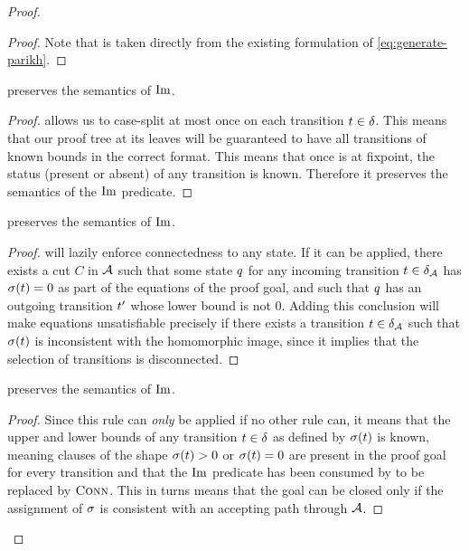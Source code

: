 \documentclass[acmsmall,review,anonymous,screen]{acmart}\settopmatter{printfolios=true,printccs=false,printacmref=true}
\theoremstyle{definition}
\begin{document}
\begin{proof}
\begin{proof}
  Note that \Expand{} is taken directly from the existing formulation of
  \eqref{eq:generate-parikh}.
\end{proof}

\begin{lemma}\label{lma:split-preserves}
  \Split{} preserves the semantics of $\operatorname{Im}$.
\end{lemma}
\begin{proof}
  \Split{} allows us to case-split at most once on each transition $t
  \in \delta$. This means that our proof tree at its leaves will be
  guaranteed to have all transitions of known bounds in the correct format. This
  means that once \Split{} is at fixpoint, the status (present or absent) of any
  transition is known. Therefore it preserves the semantics of the $\operatorname{Im}$
  predicate.
\end{proof}

\begin{lemma}\label{lma:propagate-preserves}
  \Propagate{} preserves the semantics of $\operatorname{Im}$.
\end{lemma}
\begin{proof}
  \Propagate{} will lazily enforce connectedness to any state. If it can be
  applied, there exists a cut $C$ in $\mathcal{A}$ such that some state $q$
  for any incoming transition $t \in \delta_{\mathcal{A}}$ has
  $\operatorname{\sigma}(t) = 0$  as part of the equations of the proof goal, and such that
  $q$ has an outgoing transition $t'$ whose lower bound is not
  $0$. Adding this conclusion will make equations unsatisfiable precisely if
  there exists a transition $t \in \delta_{\mathcal{A}}$ such that
  $\operatorname{\sigma}(t)$ is inconsistent with the homomorphic image, since it
  implies that the selection of transitions is disconnected.
\end{proof}

\begin{lemma}\label{lma:subsume-preserves}
  \Subsume{} preserves the semantics of $\operatorname{Im}$.
\end{lemma}
\begin{proof}
  Since this rule can \emph{only} be applied if no other rule can, it means that
  the upper and lower bounds of any transition $t \in \delta$ as
  defined by $\operatorname{\sigma}(t)$ is known, meaning clauses of the shape
  $\operatorname{\sigma}(t) > 0$ or $\operatorname{\sigma}(t) = 0$ are present in the
  proof goal for every transition and that the $\operatorname{Im}$ predicate has been
  consumed by \Expand{} to be replaced by $\operatorname{\textsc{Conn}}$. This in turns means that
  the goal can be closed only if the assignment of $\operatorname{\sigma}$ is consistent with
  an accepting path through $\mathcal{A}$.
  

\end{proof}
\end{proof}
\end{document}
